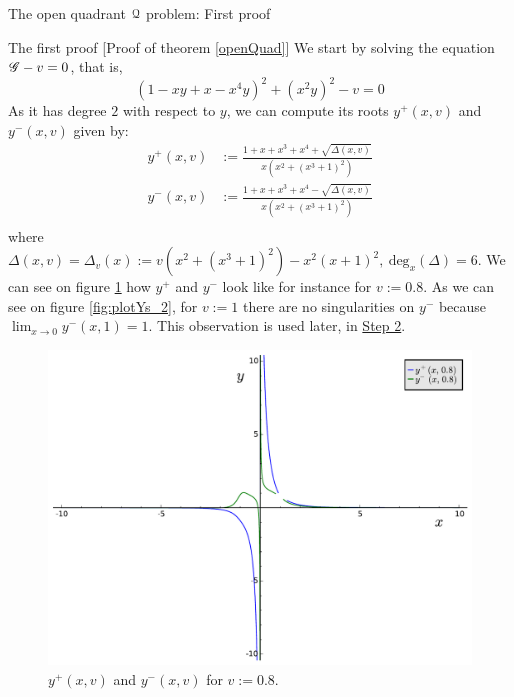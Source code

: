 \documentclass[11pt, a4paper, english, twoside, notitlepage, openright]{report}
\begin{document}
\begin{chapter}{The open quadrant $\mathcal{Q}$ problem: First proof}
\begin{section}{The first proof} [Proof of theorem \ref{openQuad}]
We start by solving the equation $\mathscr{G}-v=0$, that is, 
$$
(1-xy+x-x^4y)^2+(x^2y)^2-v=0
$$ 
As it has degree $2$ with respect to $y$, we can compute its roots $y^+(x,v)$ and $y^-(x,v)$ given by:
\begin{equation*}
\begin{aligned}
y^+(x,v)&:=\frac{1+x+x^3+x^4+\sqrt{\Delta(x,v)}}{x(x^2+(x^3+1)^2)}\\
y^-(x,v)&:=\frac{1+x+x^3+x^4-\sqrt{\Delta(x,v)}}{x(x^2+(x^3+1)^2)}\\
\end{aligned}
\end{equation*}
where $\Delta(x,v)=\Delta_v(x):=v(x^2+(x^3+1)^2)-x^2(x+1)^2,\ \text{deg}_x(\Delta)=6$. We can see on figure \ref{fig:plotYs_1} how $y^+$ and $y^-$ look like for instance for $v:=0.8$. As we can see on figure \ref{fig:plotYs_2}, for $v:=1$ there are no singularities on $y^-$ because $\lim_{x\rightarrow0}y^-(x,1)=1$. This observation is used later, in \hyperref[step2]{Step 2}.
\begin{figure}[h]
\centering
\includegraphics[width=1\textwidth]{plots/ch1_06_sols.pdf}
\caption{$y^+(x,v)$ and $y^-(x,v)$ for $v:= 0.8$.\label{fig:plotYs_1}}
\end{figure}
\begin{figure}[h]
\centering

\end{figure}
\end{section}
\end{chapter}
\end{document}
